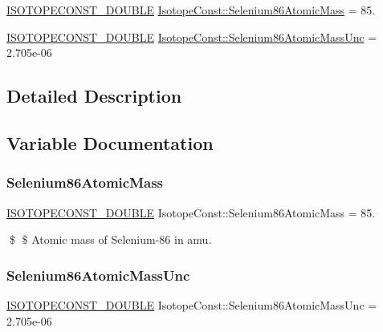 \begin{DoxyCompactItemize}
\item 
\mbox{\hyperlink{group___isotope_const-_macros_ga8f45a7272ce02c0b4c65c44636ed719a}{I\+S\+O\+T\+O\+P\+E\+C\+O\+N\+S\+T\+\_\+\+D\+O\+U\+B\+LE}} \mbox{\hyperlink{group___isotope_const-_selenium-_se86_ga23bba069804a1edb52ebd71b023a68e4}{Isotope\+Const\+::\+Selenium86\+Atomic\+Mass}} = 85.
\item 
\mbox{\hyperlink{group___isotope_const-_macros_ga8f45a7272ce02c0b4c65c44636ed719a}{I\+S\+O\+T\+O\+P\+E\+C\+O\+N\+S\+T\+\_\+\+D\+O\+U\+B\+LE}} \mbox{\hyperlink{group___isotope_const-_selenium-_se86_ga0e96ffec5a897b71bf4a2b19412ae37c}{Isotope\+Const\+::\+Selenium86\+Atomic\+Mass\+Unc}} = 2.\+705e-\/06
\end{DoxyCompactItemize}


\subsection{Detailed Description}


\subsection{Variable Documentation}
\mbox{\label{group___isotope_const-_selenium-_se86_ga23bba069804a1edb52ebd71b023a68e4}} 
\subsubsection{\texorpdfstring{Selenium86\+Atomic\+Mass}{Selenium86AtomicMass}}
{\footnotesize\ttfamily \mbox{\hyperlink{group___isotope_const-_macros_ga8f45a7272ce02c0b4c65c44636ed719a}{I\+S\+O\+T\+O\+P\+E\+C\+O\+N\+S\+T\+\_\+\+D\+O\+U\+B\+LE}} Isotope\+Const\+::\+Selenium86\+Atomic\+Mass = 85.}

\$ \$ Atomic mass of Selenium-\/86 in amu. \mbox{\label{group___isotope_const-_selenium-_se86_ga0e96ffec5a897b71bf4a2b19412ae37c}} 
\subsubsection{\texorpdfstring{Selenium86\+Atomic\+Mass\+Unc}{Selenium86AtomicMassUnc}}
{\footnotesize\ttfamily \mbox{\hyperlink{group___isotope_const-_macros_ga8f45a7272ce02c0b4c65c44636ed719a}{I\+S\+O\+T\+O\+P\+E\+C\+O\+N\+S\+T\+\_\+\+D\+O\+U\+B\+LE}} Isotope\+Const\+::\+Selenium86\+Atomic\+Mass\+Unc = 2.\+705e-\/06}

